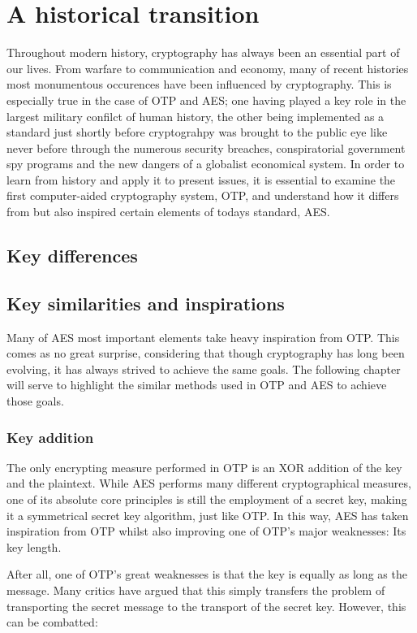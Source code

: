 \documentclass[12pt]{report}
\theoremstyle{definition}
\theoremstyle{remark}
\begin{document}
\chapter{A historical transition}
Throughout modern history, cryptography has always been an essential part of our lives. From warfare to communication and economy, many of recent histories most monumentous occurences have been influenced by cryptography. This is especially true in the case of OTP and AES; one having played a key role in the largest military confilct of human history, the other being implemented as a standard just shortly before cryptograhpy was brought to the public eye like never before through the numerous security breaches, conspiratorial government spy programs and the new dangers of a globalist economical system. In order to learn from history and apply it to present issues, it is essential to examine the first computer-aided cryptography system, OTP, and understand how it differs from but also inspired certain elements of todays standard, AES.

\section{Key differences}

\section{Key similarities and inspirations}
Many of AES most important elements take heavy inspiration from OTP. This comes as no great surprise, considering that though cryptography has long been evolving, it has always strived to achieve the same goals. The following chapter will serve to highlight the similar methods used in OTP and AES to achieve those goals.

\subsection{Key addition}
The only encrypting measure performed in OTP is an XOR addition of the key and the plaintext. While AES performs many different cryptographical measures, one of its absolute core principles is still the employment of a secret key, making it a symmetrical secret key algorithm, just like OTP. In this way, AES has taken inspiration from OTP whilst also improving one of OTP's major weaknesses: Its key length.

After all, one of OTP's great weaknesses is that the key is equally as long as the message. Many critics have argued that this simply transfers the problem of transporting the secret message to the transport of the secret key. However, this can be combatted:
\end{document}

